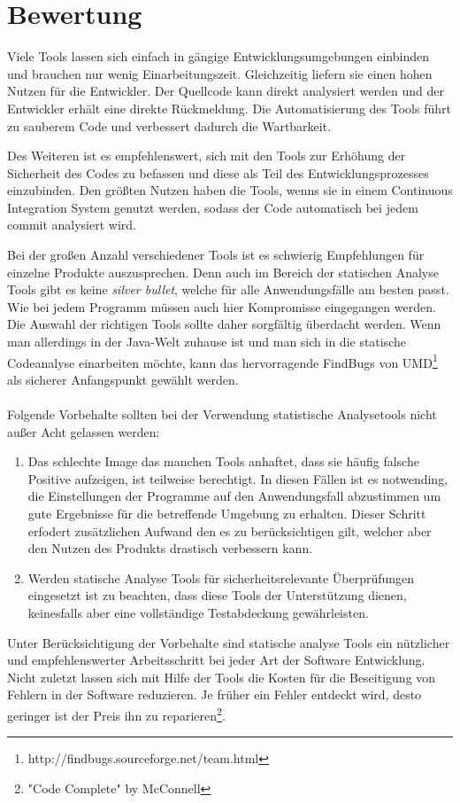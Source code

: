 \section{Bewertung}
Viele Tools lassen sich einfach in gängige Entwicklungsumgebungen einbinden und brauchen nur wenig Einarbeitungszeit. Gleichzeitig liefern sie einen hohen Nutzen für die Entwickler. Der Quellcode kann direkt analysiert werden und der Entwickler erhält eine direkte Rückmeldung. Die Automatisierung des Tools führt zu sauberem Code und verbessert dadurch die Wartbarkeit.

Des Weiteren ist es empfehlenswert, sich mit den Tools zur Erhöhung der Sicherheit des Codes zu befassen und diese als Teil des Entwicklungsprozesses einzubinden. Den größten Nutzen haben die Tools, wenns sie in einem Continuous Integration System genutzt werden, sodass der Code automatisch bei jedem commit analysiert wird.

Bei der großen Anzahl verschiedener Tools ist es schwierig Empfehlungen für einzelne Produkte auszusprechen. Denn auch im Bereich der statischen Analyse Tools gibt es keine \emph{silver bullet}, welche für alle Anwendungsfälle am besten passt. Wie bei jedem Programm müssen auch hier Kompromisse eingegangen werden. Die Auswahl der richtigen Tools sollte daher sorgfältig überdacht werden. Wenn man allerdings in der Java-Welt zuhause ist und man sich in die statische Codeanalyse einarbeiten möchte, kann das hervorragende FindBugs von UMD\footnote{http://findbugs.sourceforge.net/team.html} als sicherer Anfangspunkt gewählt werden.
\\\\
Folgende Vorbehalte sollten bei der Verwendung statistische Analysetools nicht außer Acht gelassen werden:
\begin{enumerate}
  \item Das schlechte Image das manchen Tools anhaftet, dass sie häufig falsche Positive aufzeigen, ist teilweise berechtigt. In diesen Fällen ist es notwending, die Einstellungen der Programme auf den Anwendungsfall abzustimmen um gute Ergebnisse für die betreffende Umgebung zu erhalten. Dieser Schritt erfodert zusätzlichen Aufwand den es zu berücksichtigen gilt, welcher aber den Nutzen des Produkts drastisch verbessern kann.
  \item Werden statische Analyse Tools für sicherheitsrelevante Überprüfungen eingesetzt ist zu beachten, dass diese Tools der Unterstützung dienen, keinesfalls aber eine vollständige Testabdeckung gewährleisten.
\end{enumerate}

Unter Berücksichtigung der Vorbehalte sind statische analyse Tools ein nützlicher und empfehlenswerter Arbeitsschritt bei jeder  Art der Software Entwicklung. Nicht zuletzt lassen sich mit Hilfe der Tools die Kosten für die Beseitigung von Fehlern in der Software reduzieren. Je früher ein Fehler entdeckt wird, desto geringer ist der Preis ihn zu reparieren\footnote{"Code Complete" by McConnell}.

